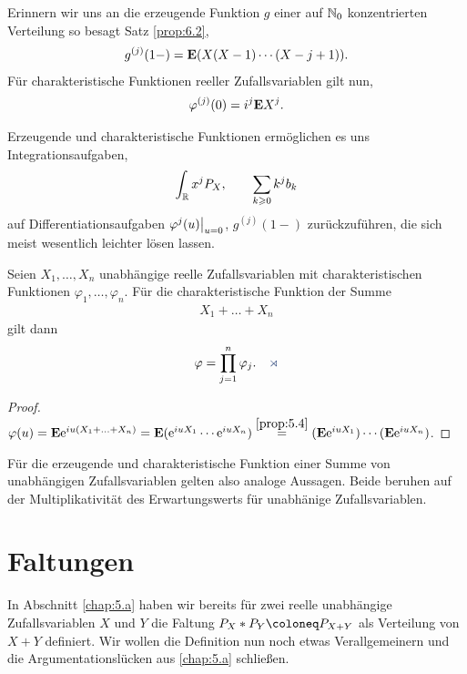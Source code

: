 Erinnern wir uns an die erzeugende Funktion $g$ einer auf $\mathbb{N}_0$ konzentrierten
Verteilung so besagt Satz \ref{prop:6.2},
\begin{align*}
g^{(j)}(1-) = \textbf{E} (X(X-1)\cdots(X-j+1)).
\end{align*}
Für charakteristische Funktionen reeller Zufallsvariablen gilt nun,
\begin{align*}
\varphi^{(j)}(0) = i^j\textbf{E} X^j.
\end{align*}

Erzeugende und charakteristische Funktionen ermöglichen es uns
Integrationsaufgaben,
\begin{align*}
\int_{\mathbb{R}} x^j P_X,\qquad \sum_{k\geqslant 0} k^j b_k 
\end{align*}
auf Differentiationsaufgaben $\varphi^{j}(u)\big|_{u=0}$, $g^{(j)}(1-)$ 
zurückzuführen, die sich meist wesentlich leichter lösen lassen.


\begin{prop}
\label{prop:6.7}
Seien $X_{1},\ldots ,X_{n}$ unabhängige reelle Zufallsvariablen mit
charakteristischen Funktionen $\varphi_{1},\ldots ,\varphi _{n}$. Für die
charakteristische Funktion der Summe
\begin{align*}
X_{1}+\ldots +X_{n}
\end{align*}
gilt dann
\begin{align*}
\ph = \prod\limits^ {n}_{j=1} \ph _{j}.\fishhere
\end{align*}
\end{prop}

\begin{proof}
$\varphi(u)=\textbf{E} \mathrm{e}^{iu(X_1+\ldots+X_n)} = \textbf{E}(\mathrm{e}^{iu X_1}\cdots \mathrm{e}^{iu X_n}) 
\overset{\ref{prop:5.4}}{=}(\textbf{E} \mathrm{e}^{iu X_1})\cdots (\textbf{E} \mathrm{e}^{iu X_n})$.\qedhere
\end{proof}

Für die erzeugende und charakteristische Funktion einer Summe von unabhängigen
Zufallsvariablen gelten also analoge Aussagen. Beide beruhen auf der
Multiplikativität des Erwartungswerts für unabhänige Zufallsvariablen.

\section{Faltungen}

In Abschnitt \ref{chap:5.a} haben wir bereits für zwei reelle unabhängige
Zufallsvariablen $X$ und $Y$ die Faltung $P_X*P_Y\defl P_{X+Y}$ als Verteilung von
$X+Y$ definiert. Wir wollen die Definition nun noch etwas Verallgemeinern und
die Argumentationslücken aus \ref{chap:5.a} schließen. 


